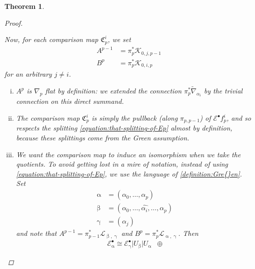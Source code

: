 \documentclass[11pt,fleqn]{article}
\theoremstyle{plain}
\newtheorem{theorem}{Theorem}[subsection]
\theoremstyle{definition}
\theoremstyle{remark}
\numberwithin{equation}{theorem}
\newcommand{\restricted}{\mathbin{\big\vert}}
\newcommand{\comparison}[1]{\mathfrak{C}_{#1}}
\begin{document}
\begin{theorem}
\begin{proof}
\begin{enumerate}
                        Now, for each comparison map $\comparison{p}^i$, we set
                        \begin{align*}
                            A^{p-1} &= \pi_p^*\mathcal{K}_{0,j,p-1}\\
                            B^p &= \pi_p^*\mathcal{K}_{0,i,p}
                        \end{align*}
                        for an arbitrary $j\neq i$.
                        \begin{enumerate}[(i)]
                            \item $A^p$ is $\nabla_p$ flat by definition: we extended the connection $\pi_p^*\widetilde{\nabla}_{\alpha_i}$ by the trivial connection on this direct summand.
                            \item The comparison map $\comparison{p}^i$ is simply the pullback (along $\pi_{p,p-1}$) of $\mathcal{E}^\bullet f_p^i$, and so respects the splitting \cref{equation:that-splitting-of-Ep} almost by definition, because these splittings come from the Gre{}en assumption.
                            \item We want the comparison map to induce an isomorphism when we take the quotients.
                                To avoid getting lost in a mire of notation, instead of using \cref{equation:that-splitting-of-Ep}, we use the language of \cref{definition:Gre{}en}.
                                Set
                                \begin{align*}
                                    \upalpha &= (\alpha_0,\ldots,\alpha_p)\\
                                    \upbeta &= (\alpha_0,\ldots,\widehat{\alpha_i},\ldots,\alpha_p)\\
                                    \upgamma &= (\alpha_j)
                                \end{align*}
                                and note that $A^{p-1}=\pi_{p-1}^* \mathcal{L}_{\upbeta,\upgamma}$ and $B^p=\pi_p^* \mathcal{L}_{\upalpha,\upgamma}$.
                                Then
                                \begin{equation*}
                                    \begin{array}{lr}
                                        \mathcal{E}_\upalpha^\bullet
                                        \cong
                                        \mathcal{E}_\upgamma^\bullet \restricted U_\upbeta \restricted U_\upalpha
                                        &\oplus

\end{array}
\end{equation*}
\end{enumerate}
\end{enumerate}
\end{proof}
\end{theorem}
\end{document}
